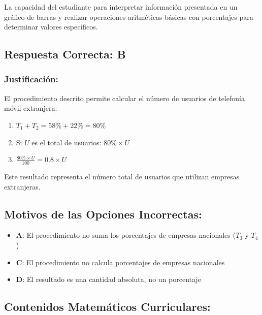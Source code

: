 \documentclass[
]{article}
\providecommand{\tightlist}{%
  \setlength{\itemsep}{0pt}\setlength{\parskip}{0pt}}
\begin{document}
La capacidad del estudiante para interpretar información presentada en
un gráfico de barras y realizar operaciones aritméticas básicas con
porcentajes para determinar valores específicos.

\subsection{Respuesta Correcta: B}\label{respuesta-correcta-b-1}

\subsubsection{Justificación:}\label{justificaciuxf3n-6}

El procedimiento descrito permite calcular el número de usuarios de
telefonía móvil extranjera:

\begin{enumerate}
\def\labelenumi{\arabic{enumi}.}
\tightlist
\item
  \(T_1 + T_2 = 58\% + 22\% = 80\%\)
\item
  Si \(U\) es el total de usuarios: \(80\% \times U\)
\item
  \(\frac{80\% \times U}{100} = 0.8 \times U\)
\end{enumerate}

Este resultado representa el número total de usuarios que utilizan
empresas extranjeras.

\subsection{Motivos de las Opciones
Incorrectas:}\label{motivos-de-las-opciones-incorrectas-1}

\begin{itemize}
\tightlist
\item
  \textbf{A}: El procedimiento no suma los porcentajes de empresas
  nacionales (\(T_3\) y \(T_4\))
\item
  \textbf{C}: El procedimiento no calcula porcentajes de empresas
  nacionales
\item
  \textbf{D}: El resultado es una cantidad absoluta, no un porcentaje
\end{itemize}

\subsection{Contenidos Matemáticos
Curriculares:}\label{contenidos-matemuxe1ticos-curriculares-5}
\end{document}
